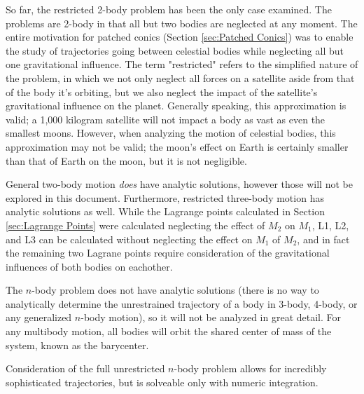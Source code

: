 \documentclass[../basicOrbitalDynamics.tex]{subfiles}
\begin{document}
So far, the restricted 2-body problem has been the only case examined. The problems are 2-body in that all but two bodies are neglected at any moment. The entire motivation for patched conics (Section \ref{sec:Patched Conics}) was to enable the study of trajectories going between celestial bodies while neglecting all but one gravitational influence. The term "restricted" refers to the simplified nature of the problem, in which we not only neglect all forces on a satellite aside from that of the body it's orbiting, but we also neglect the impact of the satellite's gravitational influence on the planet. Generally speaking, this approximation is valid; a 1,000 kilogram satellite will not impact a body as vast as even the smallest moons. However, when analyzing the motion of celestial bodies, this approximation may not be valid; the moon's effect on Earth is certainly smaller than that of Earth on the moon, but it is not negligible. 

General two-body motion \textit{does} have analytic solutions, however those will not be explored in this document. Furthermore, restricted three-body motion has analytic solutions as well. While the Lagrange points calculated in Section \ref{sec:Lagrange Points} were calculated neglecting the effect of $M_2$ on $M_1$, L1, L2, and L3 can be calculated without neglecting the effect on $M_1$ of $M_2$, and in fact the remaining two Lagrane points require consideration of the gravitational influences of both bodies on eachother.

The $n$-body problem does not have analytic solutions (there is no way to analytically determine the unrestrained trajectory of a body in 3-body, 4-body, or any generalized $n$-body motion), so it will not be analyzed in great detail. For any multibody motion, all bodies will orbit the shared center of mass of the system, known as the barycenter.

Consideration of the full unrestricted $n$-body problem allows for incredibly sophisticated trajectories, but is solveable only with numeric integration.
\end{document}
